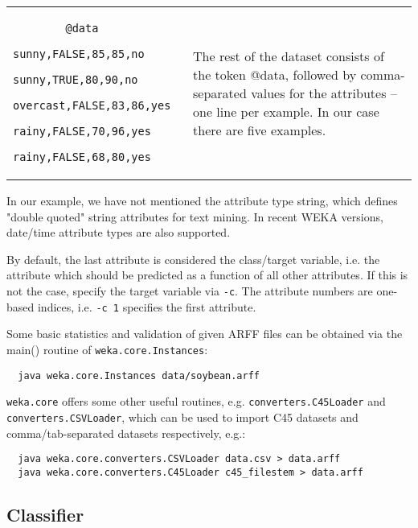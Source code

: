 \vspace{0.5cm}
\noindent
\begin{tabular}{l l}
	\begin{minipage}{7cm}
		{\scriptsize
		\begin{verbatim}
		@data
		sunny,FALSE,85,85,no
		sunny,TRUE,80,90,no
		overcast,FALSE,83,86,yes
		rainy,FALSE,70,96,yes
		rainy,FALSE,68,80,yes
		\end{verbatim}}
	\end{minipage}
	&
	\begin{minipage}{5cm}
	The rest of the dataset consists of the token @data, followed by comma-separated values for the attributes -- one line per example. In our case there are five examples.
	\end{minipage}
	\\
\end{tabular}

\vspace{0.5cm}

In our example, we have not mentioned the attribute type string, which defines "double quoted" string attributes for text mining. In recent WEKA versions, date/time attribute types are also supported.

By default, the last attribute is considered the class/target variable, i.e. the attribute which should be predicted as a function of all other attributes. If this is not the case, specify the target variable via \texttt{-c}. The attribute numbers are one-based indices, i.e. \texttt{-c 1} specifies the first attribute.

Some basic statistics and validation of given ARFF files can be obtained via the main() routine of \texttt{weka.core.Instances}:

{\scriptsize
\begin{verbatim}
  java weka.core.Instances data/soybean.arff
\end{verbatim}}

\noindent \texttt{weka.core} offers some other useful routines, e.g. \texttt{converters.C45Loader} and \texttt{converters.CSVLoader}, which can be used to import C45 datasets and comma/tab-separated datasets respectively, e.g.:

{\scriptsize
\begin{verbatim}
  java weka.core.converters.CSVLoader data.csv > data.arff
  java weka.core.converters.C45Loader c45_filestem > data.arff
\end{verbatim}}

\newpage
\subsection{Classifier}

